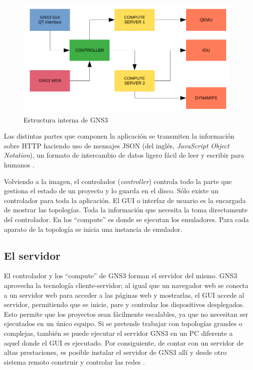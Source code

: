 \begin{figure}[h]
  \centering
  \includegraphics[scale=0.6]{imagenes/estructuragns3}
  \caption{Estructura interna de GNS3}
  \label{fig:estructuragns3}
\end{figure}

Las distintas partes que componen la aplicación se transmiten la información sobre HTTP haciendo uso de mensajes JSON (del inglés, \textit{JavaScript Object Notation}), un formato de intercambio de datos ligero fácil de leer y escribir para humanos \cite{JSON}.

Volviendo a la imagen, el controlador (\textit{controller}) controla todo la parte que gestiona el estado de un proyecto y lo guarda en el disco. Sólo existe un controlador para toda la aplicación. El GUI o interfaz de usuario es la encargada de mostrar las topologías. Toda la información que necesita la toma directamente del controlador. En los ``compute'' es donde se ejecutan los emuladores. Para cada aparato de la topología se inicia una instancia de emulador.

\subsection{El servidor}
El controlador y los ``compute'' de GNS3 forman el servidor del mismo. GNS3 aprovecha la tecnología cliente-servidor; al igual que un navegador web se conecta a un servidor web para acceder a las páginas web y mostrarlas, el GUI accede al servidor, permitiendo que se inicie, pare y controlar los dispositivos desplegados. Esto permite que los proyectos sean fácilmente escalables, ya que no necesitan ser ejecutados en un único equipo. Si se pretende trabajar con topologías grandes o complejas, también se puede ejecutar el servidor GNS3 en un PC diferente a aquel donde el GUI es ejecutado. Por consiguiente, de contar con un servidor de altas prestaciones, es posible instalar el servidor de GNS3 allí y desde otro sistema remoto construir y controlar las redes \cite{bookgns}.

